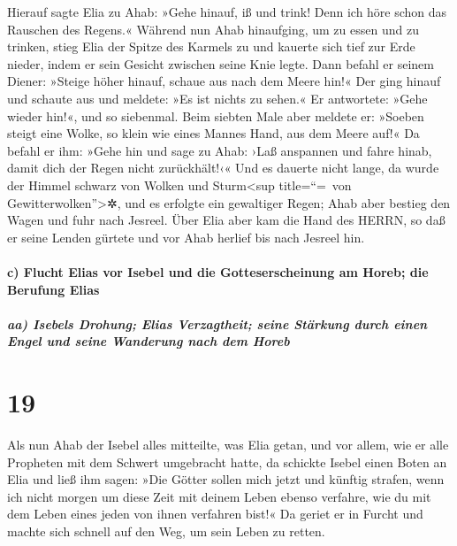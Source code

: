 Hierauf sagte Elia zu Ahab: »Gehe hinauf, iß und trink!
Denn ich höre schon das Rauschen des Regens.« Während nun
Ahab hinaufging, um zu essen und zu trinken, stieg Elia der Spitze des
Karmels zu und kauerte sich tief zur Erde nieder, indem er sein Gesicht
zwischen seine Knie legte. Dann befahl er seinem Diener:
»Steige höher hinauf, schaue aus nach dem Meere hin!« Der ging hinauf
und schaute aus und meldete: »Es ist nichts zu sehen.« Er antwortete:
»Gehe wieder hin!«, und so siebenmal. Beim siebten Male
aber meldete er: »Soeben steigt eine Wolke, so klein wie eines Mannes
Hand, aus dem Meere auf!« Da befahl er ihm: »Gehe hin und sage zu Ahab:
›Laß anspannen und fahre hinab, damit dich der Regen nicht zurückhält!‹«
Und es dauerte nicht lange, da wurde der Himmel schwarz
von Wolken und Sturm\textless sup title=``=~von
Gewitterwolken''\textgreater✲, und es erfolgte ein gewaltiger Regen;
Ahab aber bestieg den Wagen und fuhr nach Jesreel. Über
Elia aber kam die Hand des HERRN, so daß er seine Lenden gürtete und vor
Ahab herlief bis nach Jesreel hin.

\hypertarget{c-flucht-elias-vor-isebel-und-die-gotteserscheinung-am-horeb-die-berufung-elias}{%
\paragraph{c) Flucht Elias vor Isebel und die Gotteserscheinung am
Horeb; die Berufung
Elias}\label{c-flucht-elias-vor-isebel-und-die-gotteserscheinung-am-horeb-die-berufung-elias}}

\hypertarget{aa-isebels-drohung-elias-verzagtheit-seine-stuxe4rkung-durch-einen-engel-und-seine-wanderung-nach-dem-horeb}{%
\subparagraph{aa) Isebels Drohung; Elias Verzagtheit; seine Stärkung
durch einen Engel und seine Wanderung nach dem
Horeb}\label{aa-isebels-drohung-elias-verzagtheit-seine-stuxe4rkung-durch-einen-engel-und-seine-wanderung-nach-dem-horeb}}

\hypertarget{section-18}{%
\section{19}\label{section-18}}

Als nun Ahab der Isebel alles mitteilte, was Elia getan,
und vor allem, wie er alle Propheten mit dem Schwert umgebracht hatte,
da schickte Isebel einen Boten an Elia und ließ ihm sagen:
»Die Götter sollen mich jetzt und künftig strafen, wenn ich nicht morgen
um diese Zeit mit deinem Leben ebenso verfahre, wie du mit dem Leben
eines jeden von ihnen verfahren bist!« Da geriet er in
Furcht und machte sich schnell auf den Weg, um sein Leben zu retten.

